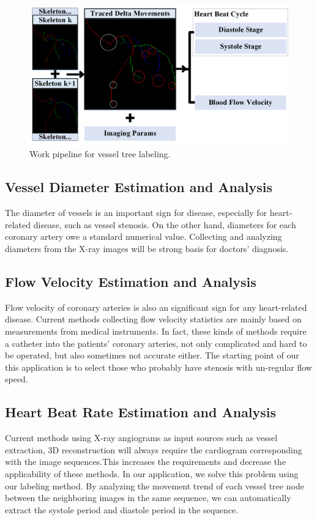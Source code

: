 \documentclass[journal]{IEEEtran}
\begin{document}
\begin{figure}[!t]
\centering
\includegraphics[width=1.0\linewidth]{./images/application-pipeline.png}
\caption{Work pipeline for vessel tree labeling.}
\label{fig:application-pipline}
\end{figure}

\label{sec:application}
\subsection{Vessel Diameter Estimation and Analysis}
The diameter of vessels is an important sign for disease, especially for heart-related disease, such as vessel stenosis. On the other hand, diameters for each coronary artery owe a standard numerical value. Collecting and analyzing diameters from the X-ray images will be strong basis for doctors' diagnosis.

\subsection{Flow Velocity Estimation and Analysis}
Flow velocity of coronary arteries is also an significant sign for any heart-related disease. Current methods collecting flow velocity statistics are mainly based on measurements from medical instruments. In fact, these kinds of methods require a catheter into the patients' coronary arteries, not only complicated and hard to be operated, but also sometimes not accurate either. The starting point of our this application is to select those who probably have stenosis with un-regular flow speed.

\subsection{Heart Beat Rate Estimation and Analysis}
Current methods using X-ray angiograms as input sources such as vessel extraction, 3D reconstruction will always require the cardiogram corresponding with the image sequences.This increases the requirements and decrease the applicability of these methods. In our application, we solve this problem using our labeling method. By analyzing the movement trend of each vessel tree node between the neighboring images in the same sequence, we can automatically extract the systole period and diastole period in the sequence.
\end{document}
